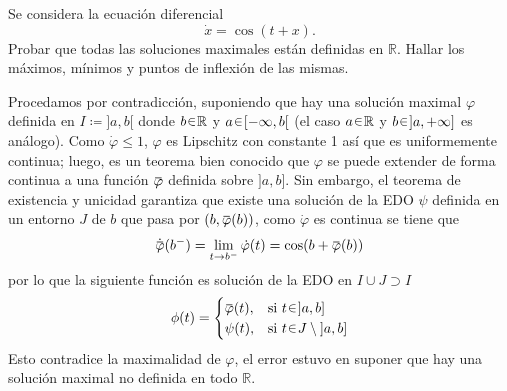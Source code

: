 \begin{ejer}
Se considera la ecuación diferencial
\[
    \dot{x} = \cos(t+x).
\]
Probar que todas las soluciones maximales están definidas en $\mathbb{R}$.  
Hallar los máximos, mínimos y puntos de inflexión de las mismas.
\end{ejer}
\begin{sol}[Demostración]

Procedamos por contradicción, suponiendo que hay una solución maximal $\varphi$ definida en $I \coloneq {]a,b[}$ donde $b \en \mathbb{R}$ y $a \en {[{-\infty}, b[}$ (el caso $a \en \mathbb{R}$ y $b \en {]a, +\infty]}$ es análogo). Como $\dot{\varphi} \leq 1$, $\varphi$ es Lipschitz con constante 1 así que es uniformemente continua; luego, es un teorema bien conocido que $\varphi$ se puede extender de forma continua a una función $\ubar{\varphi}$ definida sobre $]a,b]$. Sin embargo, el teorema de existencia y unicidad garantiza que existe una solución de la EDO $\psi$ definida en un entorno $J$ de $b$ que pasa por $(b, \ubar{\varphi}(b))$, como $\dot{\varphi}$ es continua se tiene que
\[
    \dot{\ubar{\varphi}}(b^-) = \lim_{t \to b^-} \dot\varphi(t) = \cos(b + \ubar{\varphi}(b))
\]
por lo que la siguiente función es solución de la EDO en $I \cup J \supset I$
\[
    \phi(t) =%
    \begin{cases}
        \ubar{\varphi}(t), &\text{si } t \en {]a,b]}\\
        \psi(t), &\text{si } t \en J \setminus {]a,b]}
    \end{cases}
\]
Esto contradice la maximalidad de $\varphi$, el error estuvo en suponer que hay una solución maximal no definida en todo $\mathbb{R}$.


\end{sol}
